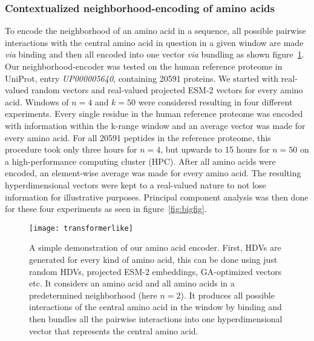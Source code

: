 \subsubsection*{Contextualized neighborhood-encoding of amino acids}\label{sssec:trans}
To encode the neighborhood of an amino acid in a sequence, all possible pairwise interactions with the central amino acid in question in a given window are made \textit{via} binding and then all encoded into one vector \textit{via} bundling as shown figure~\ref{fig:AAtr}. Our neighborhood-encoder was tested on the human reference proteome in UniProt, entry \textit{UP000005640}, containing 20591 proteins. We started with real-valued random vectors and real-valued projected ESM-2 vectors for every amino acid. Windows of $n = 4$ and $k = 50$ were considered resulting in four different experiments. Every single residue in the human reference proteome was encoded with information within the k-range window and an average vector was made for every amino acid. For all 20591 peptides in the reference proteome, this procedure took only three hours for $n = 4$, but upwards to 15 hours for $n = 50$ on a high-performance computing cluster (HPC). After all amino acids were encoded, an element-wise average was made for every amino acid. The resulting hyperdimensional vectors were kept to a real-valued nature to not lose information for illustrative purposes. Principal component analysis was then done for these four experiments as seen in figure~\ref{fig:bigfig}. 

\begin{figure}[ht!]
    \centering
    \texttt{[image: transformerlike]}
    \caption{A simple demonstration of our amino acid encoder. First, HDVs are generated for every kind of amino acid, this can be done using just random HDVs, projected ESM-2 embeddings, GA-optimized vectors etc. It considers an amino acid and all amino acids in a predetermined neighborhood (here $n = 2$). It produces all possible interactions of the central amino acid in the window by binding and then bundles all the pairwise interactions into one hyperdimensional vector that represents the central amino acid.}\label{fig:AAtr}
\end{figure}

